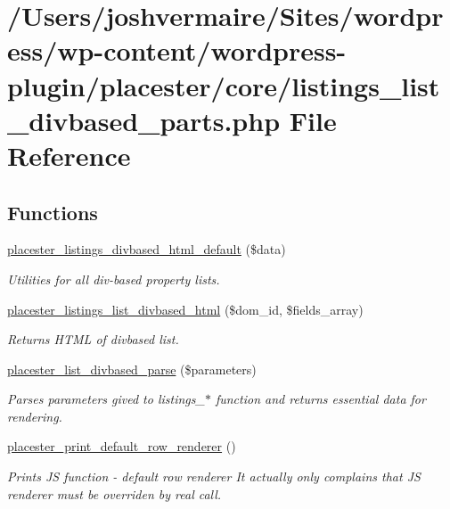 \hypertarget{listings__list__divbased__parts_8php}{
\section{/Users/joshvermaire/Sites/wordpress/wp-\/content/wordpress-\/plugin/placester/core/listings\_\-list\_\-divbased\_\-parts.php File Reference}
\label{d9/da6/listings__list__divbased__parts_8php}
}
\subsection*{Functions}
\begin{DoxyCompactItemize}
\item 
\hyperlink{listings__list__divbased__parts_8php_a84d1e2d90b6c1c0035b870ecb88fcbe0}{placester\_\-listings\_\-divbased\_\-html\_\-default} (\$data)
\begin{DoxyCompactList}\small\item\em Utilities for all div-\/based property lists. \end{DoxyCompactList}\item 
\hyperlink{listings__list__divbased__parts_8php_a16c0546cd895368d212fab1c5a5d6c37}{placester\_\-listings\_\-list\_\-divbased\_\-html} (\$dom\_\-id, \$fields\_\-array)
\begin{DoxyCompactList}\small\item\em Returns HTML of divbased list. \end{DoxyCompactList}\item 
\hyperlink{listings__list__divbased__parts_8php_a02b13356e4fcb91f208672ba1a728e5e}{placester\_\-list\_\-divbased\_\-parse} (\$parameters)
\begin{DoxyCompactList}\small\item\em Parses parameters gived to listings\_\-$\ast$ function and returns essential data for rendering. \end{DoxyCompactList}\item 
\hyperlink{listings__list__divbased__parts_8php_acf828d1fb5f27629cb1330e6707e13a9}{placester\_\-print\_\-default\_\-row\_\-renderer} ()
\begin{DoxyCompactList}\small\item\em Prints JS function -\/ default row renderer It actually only complains that JS renderer must be overriden by real call. \end{DoxyCompactList}\item 

\end{DoxyCompactItemize}
